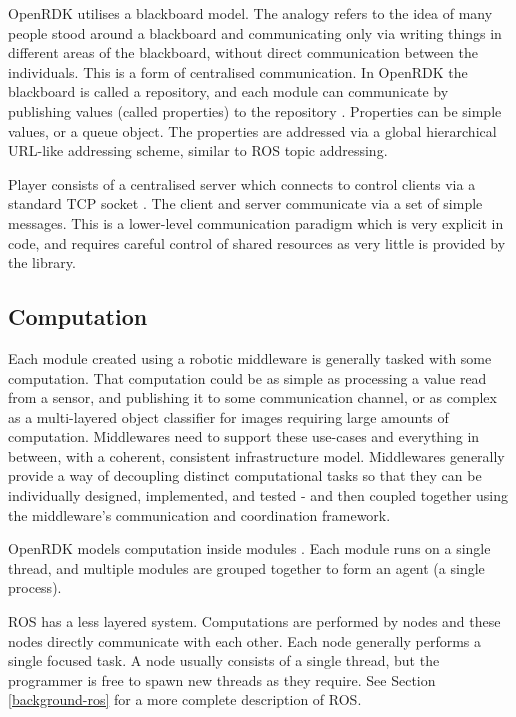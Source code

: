 \documentclass[../dissertation.tex]{subfiles}
\begin{document}
OpenRDK utilises a blackboard model. The analogy refers to the idea of many people stood around a blackboard and communicating only via writing things in different areas of the blackboard, without direct communication between the individuals. This is a form of centralised communication. In OpenRDK the blackboard is called a repository, and each module can communicate by publishing values (called properties) to the repository \cite{OpenRDKIntro}. Properties can be simple values, or a queue object. The properties are addressed via a global hierarchical URL-like addressing scheme, similar to ROS topic addressing.

Player consists of a centralised server which connects to control clients via a standard TCP socket \cite{PlayerServerManual}. The client and server communicate via a set of simple messages. This is a lower-level communication paradigm which is very explicit in code, and requires careful control of shared resources as very little is provided by the library.

\subsection{Computation}

Each module created using a robotic middleware is generally tasked with some computation. That computation could be as simple as processing a value read from a sensor, and publishing it to some communication channel, or as complex as a multi-layered object classifier for images requiring large amounts of computation. Middlewares need to support these use-cases and everything in between, with a coherent, consistent infrastructure model. Middlewares generally provide a way of decoupling distinct computational tasks so that they can be individually designed, implemented, and tested - and then coupled together using the middleware's communication and coordination framework.

OpenRDK models computation inside modules \cite{OpenRDKIntro}. Each module runs on a single thread, and multiple modules are grouped together to form an agent (a single process).

ROS has a less layered system. Computations are performed by nodes and these nodes directly communicate with each other. Each node generally performs a single focused task. A node usually consists of a single thread, but the programmer is free to spawn new threads as they require. See Section \ref{background-ros} for a more complete description of ROS.
\end{document}
